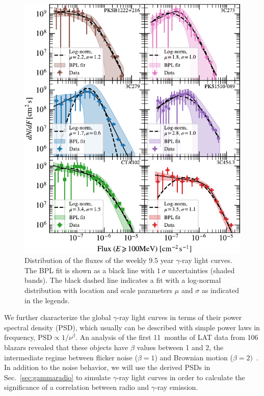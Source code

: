 \documentclass[twocolumn,linenumbers]{aastex62}
\newcommand{\gray}{$\gamma$-ray\xspace}
\begin{document}
\begin{figure}
    \includegraphics[width = .99\linewidth]{figures/fluxdist_weekly_tsmin9.pdf}
    \caption{\label{fig:fluxpdf} Distribution of the fluxes of the weekly 9.5 year \gray light curves. The BPL fit is shown as a black line with $1\,\sigma$ uncertainties (shaded bands). The black dashed line indicates a fit with a log-normal distribution with location and scale parameters $\mu$ and $\sigma$ as indicated in the legends.}
\end{figure}

We further characterize the global \gray light curves in terms of their power spectral density (PSD),
which usually can be described with simple power laws in frequency,  $\mathrm{PSD} \propto 1 / \nu^\beta$.
An analysis of the first 11~months of LAT data from 106 blazars revealed that 
these objects have $\beta$ values between 1 and 2, the intermediate regime between flicker noise ($\beta = 1$) and Brownian motion ($\beta = 2)$~\citep{2010ApJ...722..520A}. 
In addition to the noise behavior, 
we will use the derived PSDs in Sec.~\ref{sec:gammaradio} to simulate \gray light curves in order to calculate the significance of a correlation between radio and \gray emission. 
\end{document}

